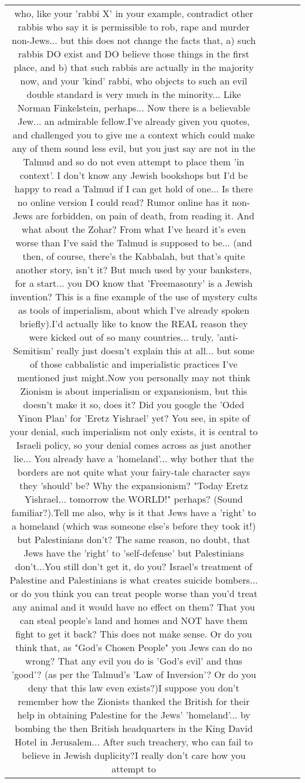 \documentclass[11pt]{article}
\newlength\mylength
\begin{document}
\begin{center}
\begin{longtable}{|C{.65\mylength}|C{.30\mylength}|C{.12\mylength}|C{.12\mylength}|C{.12\mylength}|}
who, like your 'rabbi X' in your example, contradict other rabbis who say it is permissible to rob, rape and murder non-Jews... but this does not change the facts that, a) such rabbis DO exist and DO believe those things in the first place, and b) that such rabbis are actually in the majority now, and your 'kind' rabbi, who objects to such an evil double standard is very much in the minority... Like Norman Finkelstein, perhaps... Now there is a believable Jew... an admirable fellow.I've already given you quotes, and challenged you to give me a context which could make any of them sound less evil, but you just say are not in the Talmud and so do not even attempt to place them 'in context'. I don't know any Jewish bookshops but I'd be happy to read a Talmud if I can get hold of one... Is there no online version I could read? Rumor online has it non-Jews are forbidden, on pain of death, from reading it. And what about the Zohar? From what I've heard it's even worse than I've said the Talmud is supposed to be... (and then, of course, there's the Kabbalah, but that's quite another story, isn't it? But much used by your banksters, for a start... you DO know that 'Freemasonry' is a Jewish invention? This is a fine example of the use of mystery cults as tools of imperialism, about which I've already spoken briefly).I'd actually like to know the REAL reason they were kicked out of so many countries... truly, 'anti-Semitism' really just doesn't explain this at all... but some of those cabbalistic and imperialistic practices I've mentioned just might.Now you personally may not think Zionism is about imperialism or expansionism, but this doesn't make it so, does it? Did you google the 'Oded Yinon Plan' for 'Eretz Yishrael' yet? You see, in spite of your denial, such imperialism not only exists, it is central to Israeli policy, so your denial comes across as just another lie... You already have a 'homeland'... why bother that the borders are not quite what your fairy-tale character says they 'should' be? Why the expansionism? "Today Eretz Yishrael... tomorrow the WORLD!" perhaps? (Sound familiar?).Tell me also, why is it that Jews have a 'right' to a homeland (which was someone else's before they took it!) but Palestinians don't? The same reason, no doubt, that Jews have the 'right' to 'self-defense' but Palestinians don't...You still don't get it, do you? Israel's treatment of Palestine and Palestinians is what creates suicide bombers... or do you think you can treat people worse than you'd treat any animal and it would have no effect on them? That you can steal people's land and homes and NOT have them fight to get it back? This does not make sense. Or do you think that, as "God's Chosen People" you Jews can do no wrong? That any evil you do is 'God's evil' and thus 'good'? (as per the Talmud's 'Law of Inversion'? Or do you deny that this law even exists?)I suppose you don't remember how the Zionists thanked the British for their help in obtaining Palestine for the Jews' 'homeland'... by bombing the then British headquarters in the King David Hotel in Jerusalem... After such treachery, who can fail to believe in Jewish duplicity?I really don't care how you attempt to 
\end{longtable}
\end{center}
\end{document}
